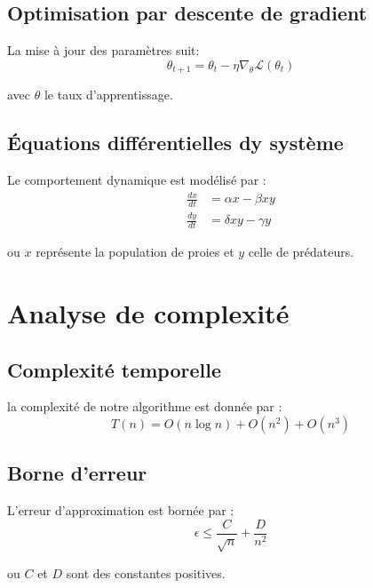 \subsection{Optimisation par descente de gradient}
La mise à jour des paramètres suit:
\begin{equation}
	\theta_{t+1} = \theta_t - \eta \nabla_\theta \mathcal{L}(\theta_t)
	\label{eq:gradient-descent}
\end{equation}

avec $\theta$ le taux d'apprentissage.

\subsection{Équations différentielles dy système}
Le comportement dynamique est modélisé par :
\begin{align}
	\frac{dx}{dt} &= \alpha x - \beta xy \label{eq:lotka-volterra1} \\
	\frac{dy}{dt} &= \delta xy - \gamma y \label{eq:lotka-volterra2}
\end{align}

ou $x$ représente la population de proies et $y$ celle de prédateurs.

\section{Analyse de complexité}

\subsection{Complexité temporelle}
la complexité de notre algorithme est donnée par : 
\begin{equation}
	T(n) = O(n \log n) + O(n^2) + O(n^3)
	\label{eq:time-complexity}
\end{equation}

\subsection{Borne d'erreur}
L'erreur d'approximation est bornée par : 
\begin{equation}
	\epsilon \leq \frac{C}{\sqrt{n}} + \frac{D}{n^2}
	\label{eq:error-bound}
\end{equation}

ou $C$ et $D$ sont des constantes positives.

